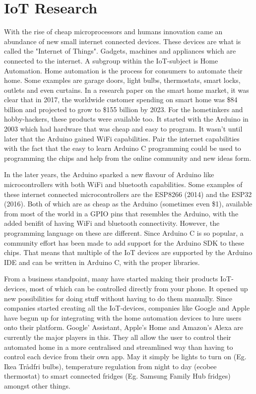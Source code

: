 \section{IoT Research}

With the rise of cheap microprocessors and humans innovation came an abundance of new small internet connected devices. These devices are what is called the "Internet of Things". Gadgets, machines and appliances which are connected to the internet\cite{iot-definition}. A subgroup within the IoT-subject is Home Automation. Home automation is the process for consumers to automate their home. Some examples are garage doors, light bulbs, thermostats, smart locks, outlets and even curtains. In a research paper\cite{home-auto-growth} on the smart home market, it was clear that in 2017, the worldwide customer spending on smart home was \$84 billion and projected to grow to \$155 billion by 2023. For the hometinkers and hobby-hackers, these products were available too. It started with the Arduino in 2003 which had hardware that was cheap and easy to program\cite{arduino-history}. It wasn't until later that the Arduino gained WiFi capabilities. Pair the internet capabilities with the fact that the easy to learn Arduino C programming could be used to programming the chips and help from the online community and new ideas form. 

In the later years, the Arduino sparked a new flavour of Arduino like microcontrollers with both WiFi and bluetooth capabilities. Some examples of these internet connected microcontrollers are the ESP8266 (2014) and the ESP32 (2016). Both of which are as cheap as the Arduino (sometimes even \$1), available from most of the world in a GPIO pins that resembles the Arduino, with the added benifit of having WiFi and bluetooth connectivity. However, the programming language on these are different. Since Arduino C is so popular, a community effort has been made to add support for the Arduino SDK to these chips. That means that multiple of the IoT devices are supported by the Arduino IDE and can be written in Arduino C, with the proper libraries.

From a business standpoint, many have started making their products IoT-devices, most of which can be controlled directly from your phone. It opened up new possibilities for doing stuff without having to do them manually. Since companies started creating all the IoT-devices, companies like Google and Apple have begun up for integrating with the home automation devices to lure users onto their platform. Google' Assistant\cite{google-assistant}, Apple's Home\cite{apple-homekit} and Amazon's Alexa\cite{amazon-alexa} are currently the major players in this. They all allow the user to control their automated home in a more centralised and streamlined way than having to control each device from their own app. May it simply be lights to turn on (Eg. Ikea Trådfri bulbs), temperature regulation from night to day (ecobee thermostat) to smart connected fridges (Eg. Samsung Family Hub fridges) amongst other things. 